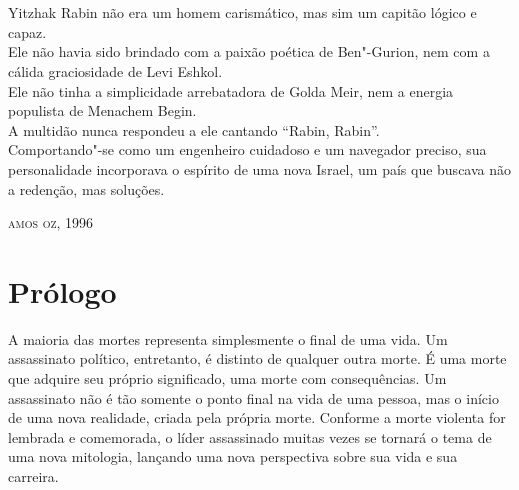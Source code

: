 \chapter*{}
\thispagestyle{empty}

\epigraph{Yitzhak Rabin não era um homem carismático, mas sim um capitão lógico e
capaz.\\
Ele não havia sido brindado com a paixão poética de Ben"-Gurion, nem com
a cálida graciosidade de Levi Eshkol.\\
Ele não tinha a simplicidade arrebatadora de Golda Meir, nem a energia
populista de Menachem Begin.\\
A multidão nunca respondeu a ele cantando ``Rabin, Rabin''.\\
Comportando"-se como um engenheiro cuidadoso e um navegador preciso, sua
personalidade incorporava o espírito de uma nova Israel, um país que
buscava não a redenção, mas soluções.}{\textsc{amos oz}, 1996}

%
%
%
%
%
%
%
%
%

\chapter[Prólogo]{Prólogo }



A maioria das mortes representa simplesmente o final de uma vida. Um
assassinato político, entretanto, é distinto de qualquer outra morte. É
uma morte que adquire seu próprio significado, uma morte com
consequências. Um assassinato não é tão somente o ponto final na vida de
uma pessoa, mas o início de uma nova realidade, criada pela própria
morte. Conforme a morte violenta for lembrada e comemorada, o líder
assassinado muitas vezes se tornará o tema de uma nova mitologia,
lançando uma nova perspectiva sobre sua vida e sua carreira.

